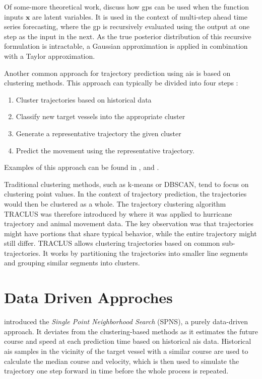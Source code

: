 Of some-more theoretical work, \citeauthor{multistep_gp}\cite{multistep_gp} discuss how \acrshort{gp}s can be used when the function inputs $\boldsymbol{x}$ are latent variables. It is used in the context of multi-step ahead time series forecasting, where the \acrshort{gp} is recursively evaluated using the output at one step as the input in the next. As the true posterior distribution of this recursive formulation is intractable, a Gaussian approximation is applied in combination with a Taylor approximation.




Another common approach for trajectory prediction using \acrshort{ais} is based on clustering methods. This approach can typically be divided into four steps \cite{dalsnes-hexeberg}:

\begin{enumerate}
    \item Cluster trajectories based on historical data
    \item Classify new target vessels into the appropriate cluster
    \item Generate a representative trajectory the given cluster
    \item Predict the movement using the representative trajectory.
\end{enumerate}

Examples of this approach can be found in \cite{palotta}, \cite{mazzarella} and \cite{mazzarella2}. 


Traditional clustering methods, such as k-means or DBSCAN, tend to focus on clustering point values. In the context of trajectory prediction, the trajectories would then be clustered as a whole. The trajectory clustering algorithm TRACLUS was therefore introduced by \cite{traclus} where it was applied to hurricane trajectory and animal movement data. The key observation was that trajectories might have portions that share typical behavior, while the entire trajectory might still differ. TRACLUS allows clustering trajectories based on common sub-trajectories. It works by partitioning the trajectories into smaller line segments and grouping similar segments into clusters. 

\section{Data Driven Approches}
\citeauthor{Hexeberg2017AISbasedVT} \cite{Hexeberg2017AISbasedVT} introduced the \textit{Single Point Neighborhood Search} (SPNS), a purely data-driven approach. It deviates from the clustering-based methods as it estimates the future course and speed at each prediction time based on historical \acrshort{ais} data. 
Historical \acrshort{ais} samples in the vicinity of the target vessel with a similar course are used to calculate the median course and velocity, which is then used to simulate the trajectory one step forward in time before the whole process is repeated. 

